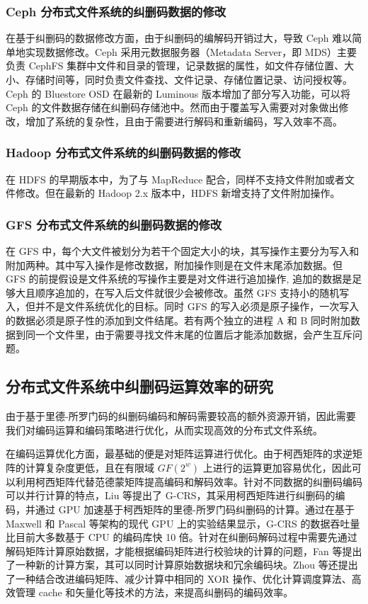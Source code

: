 \subsubsection{Ceph 分布式文件系统的纠删码数据的修改}
在基于纠删码的数据修改方面，由于纠删码的编解码开销过大，导致 Ceph 难以简单地实现数据修改。Ceph 采用元数据服务器（Metadata Server，即 MDS）主要负责 CephFS 集群中文件和目录的管理，记录数据的属性，如文件存储位置、大小、存储时间等，同时负责文件查找、文件记录、存储位置记录、访问授权等。Ceph 的 Bluestore\cite{aghayev2019file} OSD 在最新的 Luminous 版本增加了部分写入功能，可以将 Ceph 的文件数据存储在纠删码存储池中。然而由于覆盖写入需要对对象做出修改，增加了系统的复杂性，且由于需要进行解码和重新编码，写入效率不高。
\subsubsection{Hadoop 分布式文件系统的纠删码数据的修改}
在 HDFS 的早期版本中，为了与 MapReduce 配合，同样不支持文件附加或者文件修改。但在最新的 Hadoop 2.x 版本中，HDFS 新增支持了文件附加操作。
\subsubsection{GFS 分布式文件系统的纠删码数据的修改}
在 GFS 中，每个大文件被划分为若干个固定大小的块，其写操作主要分为写入和附加两种。其中写入操作是修改数据，附加操作则是在文件末尾添加数据。但 GFS 的前提假设是文件系统的写操作主要是对文件进行追加操作, 追加的数据是足够大且顺序追加的，在写入后文件就很少会被修改。虽然 GFS 支持小的随机写入，但并不是文件系统优化的目标。同时 GFS 的写入必须是原子操作，一次写入的数据必须是原子性的添加到文件结尾。若有两个独立的进程 A 和 B 同时附加数据到同一个文件里，由于需要寻找文件末尾的位置后才能添加数据，会产生互斥问题。
\subsection{分布式文件系统中纠删码运算效率的研究}
由于基于里德-所罗门码的纠删码编码和解码需要较高的额外资源开销，因此需要我们对编码运算和编码策略进行优化，从而实现高效的分布式文件系统。

在编码运算优化方面，最基础的便是对矩阵运算进行优化。由于柯西矩阵的求逆矩阵的计算复杂度更低，且在有限域 $GF(2^w)$ 上进行的运算更加容易优化，因此可以利用柯西矩阵代替范德蒙矩阵提高编码和解码效率。针对不同数据的纠删码编码可以并行计算的特点，Liu 等\cite{liu2018g}提出了 G-CRS，其采用柯西矩阵进行纠删码的编码，并通过 GPU 加速基于柯西矩阵的里德-所罗门码纠删码的计算。通过在基于 Maxwell 和 Pascal 等架构的现代 GPU 上的实验结果显示，G-CRS 的数据吞吐量比目前大多数基于 CPU 的编码库快 10 倍。针对在纠删码解码过程中需要先通过解码矩阵计算原始数据，才能根据编码矩阵进行校验块的计算的问题，Fan 等\cite{fan2019new}提出了一种新的计算方案，其可以同时计算原始数据块和冗余编码块。Zhou 等\cite{zhou2019fast}还提出了一种结合改进编码矩阵、减少计算中相同的 XOR 操作、优化计算调度算法、高效管理 cache 和矢量化等技术的方法，来提高纠删码的编码效率。

